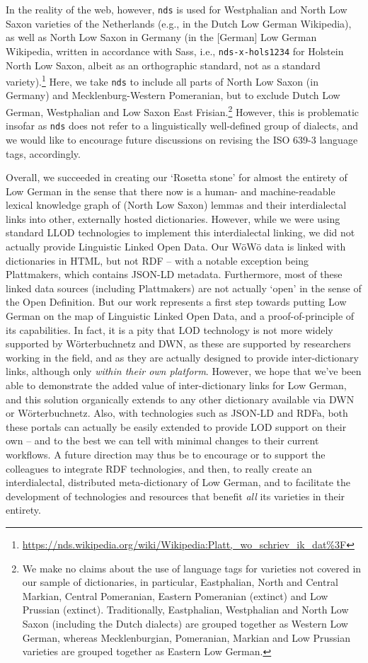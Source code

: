 \documentclass[11pt]{article}
\newcommand{\code}[1]{\texttt{#1}} %
\begin{document}
\begin{enumerate}
{} In the reality of the web, however, \code{nds} is used for Westphalian and North Low Saxon varieties of the Netherlands (e.g., in the Dutch Low German Wikipedia), as well as North Low Saxon in Germany (in the [German] Low German Wikipedia, written in accordance with Sass, i.e., \code{nds-x-hols1234} for Holstein North Low Saxon, albeit as an orthographic standard, not as a standard variety).\footnote{
    \url{https://nds.wikipedia.org/wiki/Wikipedia:Platt,_wo_schriev_ik_dat%3F}
}
Here, we take \code{nds} to include all parts of North Low Saxon (in Germany) and Mecklenburg-Western Pomeranian, but to exclude Dutch Low German, Westphalian and Low Saxon East Frisian.\footnote{
  We make no claims about the use of language tags for varieties not covered in our sample of dictionaries, in particular, Eastphalian, North and Central Markian, Central Pomeranian, Eastern Pomeranian (extinct) and Low Prussian (extinct). Traditionally, Eastphalian, Westphalian and North Low Saxon (including the Dutch dialects) are grouped together as Western Low German, whereas Mecklenburgian, Pomeranian, Markian and Low Prussian varieties are grouped together as Eastern Low German.
}
However, this is problematic insofar as \code{nds} does not refer to a linguistically well-defined group of dialects, and we would like to encourage future discussions on revising the ISO 639-3 language tags, accordingly.

Overall, we succeeded in creating our `Rosetta stone' for almost the entirety of Low German in the sense that there now is a human- and machine-readable lexical knowledge graph of (North Low Saxon) lemmas and their interdialectal links into other, externally hosted dictionaries.
However, while we were using standard LLOD technologies to implement this interdialectal linking, we did not actually provide Linguistic Linked Open Data. Our WöWö data is linked with dictionaries in HTML, but not RDF -- with a notable exception being Plattmakers, which contains JSON-LD metadata. 
Furthermore, most of these linked data sources (including Plattmakers) are not actually `open' in the sense of the Open Definition. 
But our work represents a first step towards putting Low German on the map of Linguistic Linked Open Data, and a proof-of-principle of its capabilities.
In fact, it is a pity that LOD technology is not more widely supported by Wörterbuchnetz and DWN, as these are supported by researchers working in the field, and as they are actually designed to provide inter-dictionary links, although only \emph{within their own platform}. 
However, we hope that we've been able to demonstrate the added value of inter-dictionary links for Low German, and this solution organically extends to any other dictionary available via DWN or Wörterbuchnetz. Also, with technologies such as JSON-LD and RDFa, both these portals can actually be easily extended to provide LOD support on their own -- and to the best we can tell with minimal changes to their current workflows.
A future direction may thus be to encourage or to support the colleagues to integrate RDF technologies, and then, to really create an interdialectal, distributed meta-dictionary of Low German, and to facilitate the development of technologies and resources that benefit \emph{all} its varieties in their entirety.


\end{enumerate}
\end{document}
